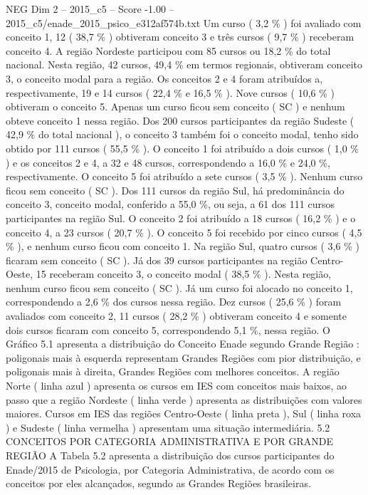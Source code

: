 \begin{textsample}{NEG Dim 2 – 2015\_c5 – Score -1.00 – 2015\_c5/enade\_2015\_psico\_e312af574b.txt}
Um curso ( 3,2 \% ) foi avaliado com conceito 1, 12 ( 38,7 \% ) obtiveram conceito 3 e três cursos ( 9,7 \% ) receberam conceito 4.
A região Nordeste participou com 85 cursos ou 18,2 \% do total nacional.
Nesta região, 42 cursos, 49,4 \% em termos regionais, obtiveram conceito 3, o conceito modal para a região.
Os conceitos 2 e 4 foram atribuídos a, respectivamente, 19 e 14 cursos ( 22,4 \% e 16,5 \% ).
Nove cursos ( 10,6 \% ) obtiveram o conceito 5.
Apenas um curso ficou sem conceito ( SC ) e nenhum obteve conceito 1 nessa região.
Dos 200 cursos participantes da região Sudeste ( 42,9 \% do total nacional ), o conceito 3 também foi o conceito modal, tenho sido obtido por 111 cursos ( 55,5 \% ).
O conceito 1 foi atribuído a dois cursos ( 1,0 \% ) e os conceitos 2 e 4, a 32 e 48 cursos, correspondendo a 16,0 \% e 24,0 \%, respectivamente.
O conceito 5 foi atribuído a sete cursos ( 3,5 \% ).
Nenhum curso ficou sem conceito ( SC ).
Dos 111 cursos da região Sul, há predominância do conceito 3, conceito modal, conferido a 55,0 \%, ou seja, a 61 dos 111 cursos participantes na região Sul.
O conceito 2 foi atribuído a 18 cursos ( 16,2 \% ) e o conceito 4, a 23 cursos ( 20,7 \% ).
O conceito 5 foi recebido por cinco cursos ( 4,5 \% ), e nenhum curso ficou com conceito 1.
Na região Sul, quatro cursos ( 3,6 \% ) ficaram sem conceito ( SC ).
Já dos 39 cursos participantes na região Centro-Oeste, 15 receberam conceito 3, o conceito modal ( 38,5 \% ).
Nesta região, nenhum curso ficou sem conceito ( SC ).
Já um curso foi alocado no conceito 1, correspondendo a 2,6 \% dos cursos nessa região.
Dez cursos ( 25,6 \% ) foram avaliados com conceito 2, 11 cursos ( 28,2 \% ) obtiveram conceito 4 e somente dois cursos ficaram com conceito 5, correspondendo 5,1 \%, nessa região.
O Gráfico 5.1 apresenta a distribuição do Conceito Enade segundo Grande Região : poligonais mais à esquerda representam Grandes Regiões com pior distribuição, e poligonais mais à direita, Grandes Regiões com melhores conceitos.
A região Norte ( linha azul ) apresenta os cursos em IES com conceitos mais baixos, ao passo que a região Nordeste ( linha verde ) apresenta as distribuições com valores maiores.
Cursos em IES das regiões Centro-Oeste ( linha preta ), Sul ( linha roxa ) e Sudeste ( linha vermelha ) apresentam uma situação intermediária. 5.2 CONCEITOS POR CATEGORIA ADMINISTRATIVA E POR GRANDE REGIÃO A Tabela 5.2 apresenta a distribuição dos cursos participantes do Enade/2015 de Psicologia, por Categoria Administrativa, de acordo com os conceitos por eles alcançados, segundo as Grandes Regiões brasileiras.

\end{textsample}
